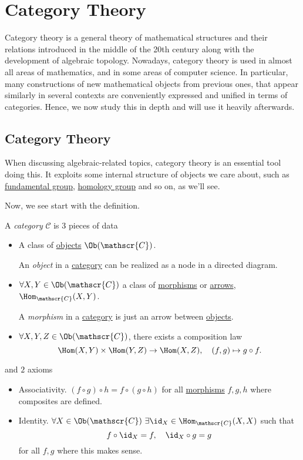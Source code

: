 \chapter{Category Theory}
Category theory is a general theory of mathematical structures and their relations introduced in the middle of the 20th century along with the development
of algebraic topology. Nowadays, category theory is used in almost all areas of mathematics, and in some areas of computer science. In particular, many
constructions of new mathematical objects from previous ones, that appear similarly in several contexts are conveniently expressed and unified in terms of
categories. Hence, we now study this in depth and will use it heavily afterwards.
\section{Category Theory}
When discussing algebraic-related topics, category theory is an essential tool doing this. It exploits some
internal structure of objects we care about, such as \hyperref[def:fundamental-group]{fundamental group},
\hyperref[def:homology-group]{homology group} and so on, as we'll see.

Now, we see start with the definition.
\begin{definition}[Category]\label{def:category}
	A \emph{category} \(\mathscr{C} \) is \(3\) pieces of data
	\begin{itemize}
		\item A class of \hyperref[def:object]{objects} \(\Ob(\mathscr{C})\).
		      \begin{definition}[Object]\label{def:object}
			      An \emph{object} in a \hyperref[def:category]{category} can be realized as a node in a directed diagram.
		      \end{definition}
		\item \(\forall X, Y\in\Ob (\mathscr{C})\) a class of \hyperref[def:morphism]{morphisms} or \underline{arrows},
		      \(\Hom_{\mathscr{C}}(X, Y)\).
		      \begin{definition}[Morphism]\label{def:morphism}
			      A \emph{morphism} in a \hyperref[def:category]{category} is just an arrow between \hyperref[def:object]{objects}.
		      \end{definition}
		\item \(\forall X, Y, Z\in \Ob (\mathscr{C})\), there exists a composition law
		      \[
			      \Hom (X, Y)\times \Hom (Y, Z)\to \Hom (X, Z),\quad (f, g)\mapsto g\circ f.
		      \]
	\end{itemize}
	and \(2\) axioms
	\begin{itemize}
		\item Associativity. \((f\circ g)\circ h = f\circ (g\circ h)\) for all \hyperref[def:morphism]{morphisms} \(f, g, h\)
		      where composites are defined.
		\item Identity. \(\forall X\in\Ob (\mathscr{C})\ \exists \id_{X}\in\Hom _{\mathscr{C}} (X, X)\) such that
		      \[
			      f\circ \id_{X} = f,\quad \id_{X} \circ g = g
		      \]
		      for all \(f, g\) where this makes sense.
	\end{itemize}
\end{definition}

